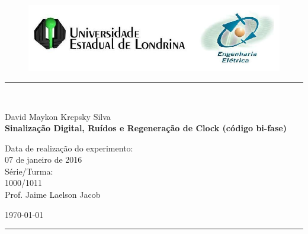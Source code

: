 \begin{titlepage}
\begin{center}
\begin{figure}[h]
\includegraphics[scale=0.76]{img/topdotitulo.png}
\end{figure}
\rule{\columnwidth}{1.5mm}
\

\large David Maykon Krepsky Silva	\\

\vspace{4cm}
{\bf \Large Sinalização Digital, Ruídos e Regeneração de Clock	(código bi-fase)}
\vspace{3.5cm}

\begin{flushright}
Data de realização do experimento:\\
07 de janeiro de 2016\\
Série/Turma:\\
1000/1011\\
Prof. Jaime Laelson Jacob
\end{flushright}

\vspace{3.2cm}
\today

\rule{\columnwidth}{1.3mm}
\end{center}
\end{titlepage}
\blankpage